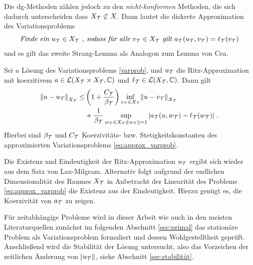Die \ac{dg}-Methoden zählen jedoch zu den \emph{nicht-konformen} Methoden, die sich dadurch unterscheiden dass $X_{\mathcal{T}}\not\subset X$. Dann lautet die diskrete Approximation des Variationsproblems
\begin{equation}
  \emph{Finde ein } u_{\mathcal{T}}\in X_{\mathcal{T}}\emph{ , sodass für alle } v_{\mathcal{T}}\in X_{\mathcal{T}} \emph{ gilt } a_{\mathcal{T}}(u_{\mathcal{T}}, v_{\mathcal{T}}) = \ell_{\mathcal{T}}(v_{\mathcal{T}})
  \label{eq:approx_varprob}
\end{equation}
und es gilt das zweite Strang-Lemma als Analogon zum Lemma von Cea.
\begin{satz}\label{strang}
  Sei $u$ Lösung des Variationsproblems \ref{varprob}, und $u_{\mathcal{T}}$ die Ritz-Approximation mit koerzitivem $a \in \mathcal{L}(X_{\mathcal{T}} \times X_{\mathcal{T}}, \mathbb{C})$ und $\ell_{\mathcal{T}} \in \mathcal{L}(X_{\mathcal{T}}, \mathbb{C})$. Dann gilt
  \begin{equation}
    \begin{aligned}
    \norm{u-u_{\mathcal{T}}}_{X_{\mathcal{T}}} \leq &\left(1 +\frac{C_{\mathcal{T}}}{\beta_{\mathcal{T}}}\right) \inf_{v_{\mathcal{T}} \in X_{\mathcal{T}}}\norm{u-v_{\mathcal{T}}}_{X_{\mathcal{T}}} \\
    & +\frac{1}{\beta_{\mathcal{T}}} \sup_{w_{\mathcal{T}} \in X_{\mathcal{T}}: \norm{w_{\mathcal{T}}}=1} |a_{\mathcal{T}}(u,w_{\mathcal{T}})-\ell_{\mathcal{T}}(w_{\mathcal{T}})| \; .
  \end{aligned}
  \end{equation}
  Hierbei sind $\beta_{\mathcal{T}}$ und $C_{\mathcal{T}}$ Koerzivitäts- bzw. Stetigkeitskonstanten des approximierten Variationsproblems \ref{eq:approx_varprob}.
\end{satz}
Die Existenz und Eindeutigkeit der Ritz-Approximation $u_{\mathcal{T}}$ ergibt sich wieder aus dem Satz von Lax-Milgram. Alternativ folgt aufgrund der endlichen Dimensionalität des Raumes $X_{\mathcal{T}}$ in Anbetracht der Linearität des Problems \eqref{eq:approx_varprob} die Existenz aus der Eindeutigkeit. Hierzu genügt es, die Koerzivität von $a_{\mathcal{T}}$ zu zeigen.

Für zeitabhängige Probleme wird in dieser Arbeit wie auch in den meisten Literaturquellen \cite{NLS} zunächst im folgenden Abschnitt \ref{sec:primal} das stationäre Problem als Variationsproblem formuliert und dessen Wohlgestelltheit geprüft. Anschließend wird die Stabilität der Lösung untersucht, also das Vorzeichen der zeitlichen Änderung von $\norm{u_{\mathcal{T}}}$, siehe Abschnitt \ref{sec:stabilität}.


